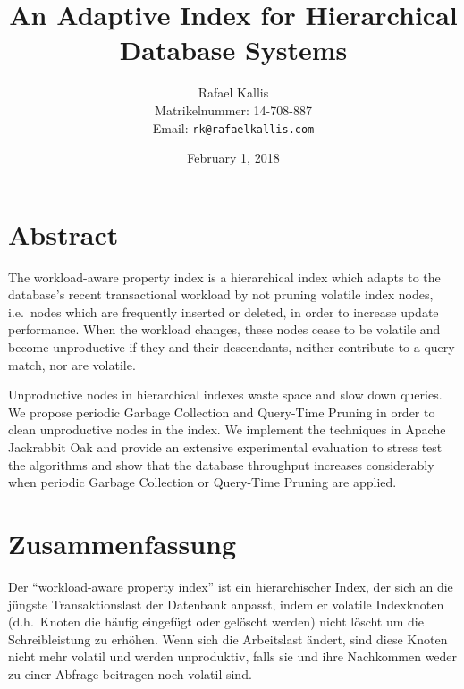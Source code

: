 \documentclass[abstracton,12pt]{scrartcl}
\title{An Adaptive Index for Hierarchical Database Systems}
\author{
    Rafael Kallis\\[-5pt]
    \scriptsize Matrikelnummer: 14-708-887\\[-5pt]
    \scriptsize Email: \texttt{rk@rafaelkallis.com}
}
\date{\vspace*{2cm}February 1, 2018}
\theoremstyle{definition}
\begin{document}
\maketitle
\thispagestyle{empty}


\newpage
\thispagestyle{empty}
\vspace*{7cm}

\section*{Abstract}

The workload-aware property index is a hierarchical index which adapts to the
database's recent transactional workload by not pruning volatile index nodes,
i.e.\ nodes which are frequently inserted or deleted, in order to increase
update performance. When the workload changes, these nodes cease to be volatile
and become unproductive if they and their descendants, neither contribute to a
query match, nor are volatile.

Unproductive nodes in hierarchical indexes waste space and slow down queries.
We propose periodic Garbage Collection and Query-Time Pruning in order to
clean unproductive nodes in the index. We implement the techniques in Apache
Jackrabbit Oak and
provide an extensive experimental evaluation to stress test the algorithms and
show that the database throughput increases considerably when periodic Garbage
Collection or Query-Time Pruning are applied.

\newpage
\thispagestyle{empty}
\vspace*{7cm}

\section*{Zusammenfassung}

Der ``workload-aware property index'' ist ein hierarchischer Index, der sich an
die jüngste Transaktionslast der Datenbank anpasst, indem er volatile
Indexknoten (d.h.\ Knoten die häufig eingefügt oder gelöscht werden) nicht löscht
um die Schreibleistung zu erhöhen. Wenn sich die Arbeitslast ändert, sind
diese Knoten nicht mehr volatil und werden unproduktiv, falls sie und ihre
Nachkommen weder zu einer Abfrage beitragen noch volatil sind.
\end{document}
